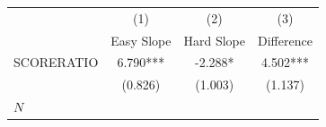 {
\def\sym#1{\ifmmode^{#1}\else\(^{#1}\)\fi}
\begin{tabular}{l*{3}{c}}
\hline\hline
            &\multicolumn{1}{c}{(1)}&\multicolumn{1}{c}{(2)}&\multicolumn{1}{c}{(3)}\\
            &\multicolumn{1}{c}{Easy Slope}&\multicolumn{1}{c}{Hard Slope}&\multicolumn{1}{c}{Difference}\\
\hline
SCORERATIO  &       6.790***&      -2.288*  &       4.502***\\
            &     (0.826)   &     (1.003)   &     (1.137)   \\
\hline
\(N\)       &               &               &               \\
\hline\hline
\end{tabular}
}
